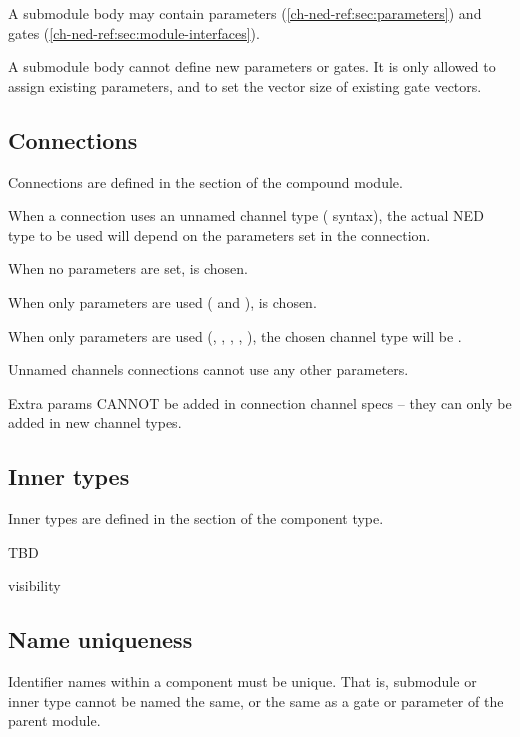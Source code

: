 A submodule body may contain parameters (\ref{ch-ned-ref:sec:parameters})
and gates (\ref{ch-ned-ref:sec:module-interfaces}).

A submodule body cannot define new parameters or gates. It is only
allowed to assign existing parameters, and to set the vector
size of existing gate vectors.



\subsection{Connections}
\label{ch-ned-ref:sec:connections}

Connections are defined in the  section of the compound module.

When a connection uses an unnamed channel type (\ttt{-{}->
\{\ldots\} -{}->} syntax), the actual NED type to be used will depend on the
parameters set in the connection.

When no parameters are set,  is chosen.

When only  parameters are used (
and ),  is chosen.

When only  parameters are used
(, , , , ),
the chosen channel type will be .

Unnamed channels connections cannot use any other parameters.

Extra params CANNOT be added in connection channel specs --
they can only be added in new channel types.



\subsection{Inner types}
\label{ch-ned-ref:sec:inner-types}

Inner types are defined in the  section of the component type.

TBD

visibility



\subsection{Name uniqueness}

Identifier names within a component must be unique. That is, submodule
or inner type cannot be named the same, or the same as a gate or
parameter of the parent module.



